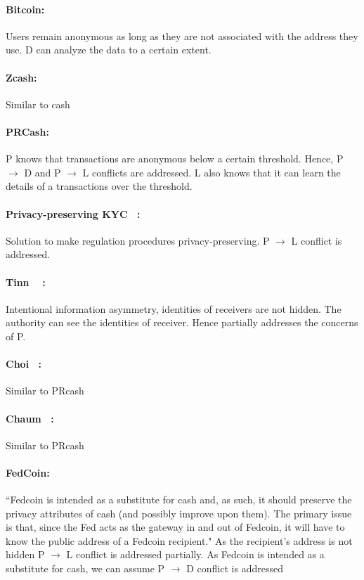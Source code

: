 \documentclass[runningheads]{llncs}
\begin{document}
 \paragraph{Bitcoin:}  Users remain anonymous as long as they are not associated with the address they use. D can analyze the data to a certain extent. 
 
 \paragraph{Zcash: } Similar to cash
 
 \paragraph{PRCash:} P knows that transactions are anonymous below a certain threshold. Hence, P $\rightarrow$ D and  P $\rightarrow$ L conflicts are addressed. L also knows that it can learn the details of a transactions over the threshold.
 
 \paragraph{Privacy-preserving KYC~\cite{BKT18} :} Solution to make regulation procedures privacy-preserving. P $\rightarrow$ L conflict is addressed.
 
 \paragraph{Tinn \etal ~\cite{TB21}	:} Intentional information asymmetry, identities of receivers are not hidden. The authority can see the identities of receiver. Hence partially addresses the concerns of P. 
 
 \paragraph{Choi \etal~\cite{CHLRS21}:} Similar to PRcash
 
 \paragraph{Chaum \etal~\cite{CGM21}:} Similar to PRcash
 
 \paragraph{FedCoin:} ``Fedcoin is intended as a substitute for cash and, as such, it should preserve the privacy attributes of cash (and possibly improve upon them). The primary issue is that, since the Fed acts as the gateway in and out of Fedcoin,
 it will have to know the public address of a Fedcoin recipient." As the recipient's address is not hidden  P $\rightarrow$ L conflict is addressed partially. As Fedcoin is intended as a substitute for cash, we can assume  P $\rightarrow$ D conflict is addressed
 
\end{document}
